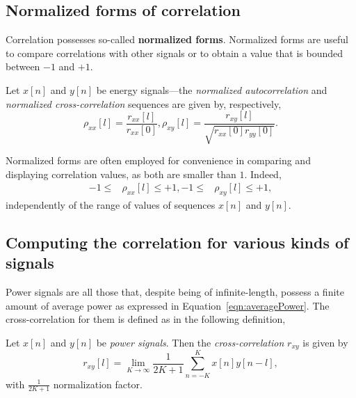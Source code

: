 \documentclass[\documentfontsize, twocolumn]{\classname}
\begin{document}
\subsection{Normalized forms of correlation}

Correlation possesses so-called \textbf{normalized forms}. Normalized forms are useful to compare correlations with other signals or to obtain a value that is bounded between $-1$ and $+1$.

\begin{defin}
    Let $x[n]$ and $y[n]$ be energy signals---the \emph{normalized autocorrelation} and \emph{normalized cross-correlation} sequences are given by, respectively,
    \begin{equation}\label{eqn:normalizedCorrelationFormulas}
        \rho_{xx}[l] = \frac{r_{xx}[l]}{r_{xx}[0]}, \rho_{xy}[l]=\frac{r_{xy}[l]}{\sqrt{r_{xx}[0]r_{yy}[0]}}.
    \end{equation}
\end{defin}

Normalized forms are often employed for convenience in comparing and displaying correlation values, as both are smaller than $1$. Indeed,
\begin{align*}
    -1 \leq &\rho_{xx}[l] \leq +1,
    -1 \leq &\rho_{xy}[l] \leq +1,
\end{align*}
independently of the range of values of sequences $x[n]$ and $y[n]$.

\subsection{Computing the correlation for various kinds of signals}

Power signals are all those that, despite being of infinite-length, possess a finite amount of average power as expressed in Equation~\ref{eqn:averagePower}. The cross-correlation for them is defined as in the following definition,
\begin{defin}
    Let $x[n]$ and $y[n]$ be \emph{power signals}. Then the \emph{cross-correlation} $r_{xy}$ is given by
    \begin{equation}\label{eqn:crossCorrelationPowerSignals}
        r_{xy}[l] = \lim_{K\rightarrow \infty} \frac 1 {2K+1} \sum_{n=-K}^K x[n]y[n-l],
    \end{equation}
    with $\frac 1 {2K+1}$ normalization factor.
\end{defin}
\end{document}
